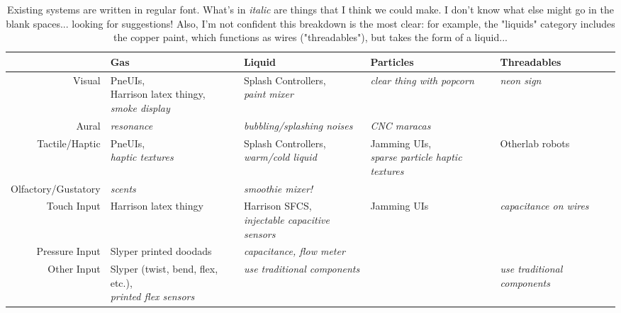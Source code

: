 \begin{table*}[t]
\caption{Existing systems are written in regular font.  What's in \emph{italic} are things that I think we could make.  I don't know what else might go in the blank spaces... looking for suggestions!  Also, I'm not confident this breakdown is the most clear: for example, the "liquids" category includes the copper paint, which functions as wires ("threadables"), but takes the form of a liquid...}
\begin{tabular}{ r || p{3cm} | p{3cm} | p{3cm} | p{3cm} }
  \hline
   & Gas & Liquid & Particles & Threadables\\ \hline \hline
  Visual & \parbox{3cm}{PneUIs, \\Harrison latex thingy, \\ \emph{smoke display}} & \parbox{3cm}{Splash Controllers, \\ \emph{paint mixer}} &\parbox{3cm}{\emph{clear thing with popcorn}} &\parbox{3cm}{\emph{neon sign}} \\ \hline
  Aural & \parbox{3cm}{\emph{resonance}} & \parbox{3cm}{\emph{bubbling/splashing noises}} &\parbox{3cm}{\emph{CNC maracas}} &\parbox{3cm}{} \\ \hline
  Tactile/Haptic & \parbox{3cm}{PneUIs,\\ \emph{haptic textures}} & \parbox{3cm}{Splash Controllers,\\ \emph{warm/cold liquid}} &\parbox{3cm}{Jamming UIs, \\ \emph{sparse particle haptic textures}} &\parbox{3cm}{Otherlab robots} \\ \hline
  Olfactory/Gustatory & \parbox{3cm}{\emph{scents}} & \parbox{3cm}{\emph{smoothie mixer!}} &\parbox{3cm}{} &\parbox{3cm}{} \\ \hline
  Touch Input & \parbox{3cm}{Harrison latex thingy} & \parbox{3cm}{Harrison SFCS, \\ \emph{injectable capacitive sensors}} &\parbox{3cm}{Jamming UIs} &\parbox{3cm}{\emph{capacitance on wires}} \\ \hline
  Pressure Input & \parbox{3cm}{Slyper printed doodads} & \parbox{3cm}{\emph{capacitance, flow meter}} &\parbox{3cm}{} &\parbox{3cm}{} \\ \hline
  Other Input & \parbox{3cm}{Slyper (twist, bend, flex, etc.), \\ \emph{printed flex sensors}} & \parbox{3cm}{\emph{use traditional components}} &\parbox{3cm}{} &\parbox{3cm}{\emph{use traditional components}} \\ \hline
\end{tabular}
\end{table*}
\